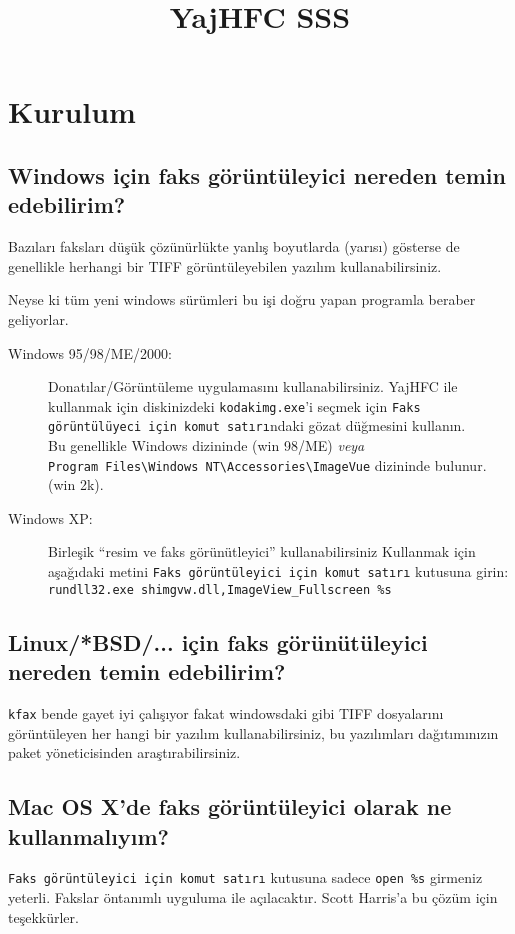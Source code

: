 \documentclass[a4paper,10pt]{scrartcl}
\title{YajHFC SSS}
\author{}
\date{}
\begin{document}
\sloppy
\maketitle

\tableofcontents

\section{Kurulum}
\subsection{Windows için faks görüntüleyici nereden temin edebilirim?}

Bazıları faksları düşük çözünürlükte yanlış boyutlarda (yarısı) gösterse de 
genellikle herhangi bir TIFF görüntüleyebilen yazılım kullanabilirsiniz.

Neyse ki tüm yeni windows sürümleri bu işi doğru yapan programla beraber geliyorlar.

\begin{description}
\item[Windows 95/98/ME/2000:]
Donatılar/Görüntüleme uygulamasını kullanabilirsiniz.
	YajHFC ile kullanmak için diskinizdeki \texttt{kodakimg.exe}'i seçmek için 
	\texttt{Faks görüntülüyeci için komut satırı}ndaki gözat düğmesini kullanın.\\
	Bu genellikle Windows dizininde (win 98/ME) \emph{veya} \\
\verb.Program Files\Windows NT\Accessories\ImageVue. dizininde bulunur. (win 2k). 
       
\item[Windows XP:]
Birleşik ``resim ve faks görünütleyici'' kullanabilirsiniz
	Kullanmak için aşağıdaki metini \texttt{Faks görüntüleyici için komut satırı} kutusuna girin:\\
	\verb#rundll32.exe shimgvw.dll,ImageView_Fullscreen %s#
 \end{description}

      
\subsection{Linux/*BSD/... için faks görünütüleyici nereden temin edebilirim?}
\texttt{kfax} bende gayet iyi çalışıyor fakat windowsdaki gibi TIFF dosyalarını görüntüleyen
her hangi bir yazılım kullanabilirsiniz, bu yazılımları dağıtımınızın paket yöneticisinden araştırabilirsiniz.


\subsection{Mac OS X'de faks görüntüleyici olarak ne kullanmalıyım?}
\texttt{Faks görüntüleyici için komut satırı} kutusuna sadece \verb.open %s. girmeniz yeterli.
Fakslar öntanımlı uyguluma ile açılacaktır.
Scott Harris'a bu çözüm için teşekkürler.
\end{document}
